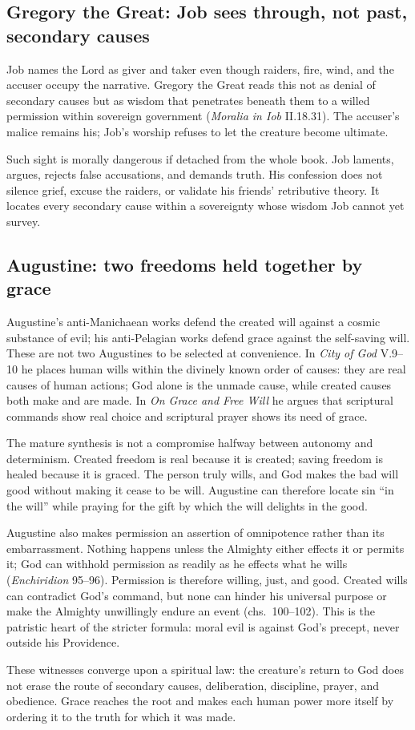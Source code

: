 \subsection{Gregory the Great: Job sees through, not past, secondary causes}

Job names the Lord as giver and taker even though raiders, fire, wind, and the accuser occupy the narrative. Gregory the Great reads this not as denial of secondary causes but as wisdom that penetrates beneath them to a willed permission within sovereign government (\emph{Moralia in Iob} II.18.31). The accuser's malice remains his; Job's worship refuses to let the creature become ultimate.

Such sight is morally dangerous if detached from the whole book. Job laments, argues, rejects false accusations, and demands truth. His confession does not silence grief, excuse the raiders, or validate his friends' retributive theory. It locates every secondary cause within a sovereignty whose wisdom Job cannot yet survey.

\subsection{Augustine: two freedoms held together by grace}

Augustine's anti-Manichaean works defend the created will against a cosmic substance of evil; his anti-Pelagian works defend grace against the self-saving will. These are not two Augustines to be selected at convenience. In \emph{City of God} V.9--10 he places human wills within the divinely known order of causes: they are real causes of human actions; God alone is the unmade cause, while created causes both make and are made. In \emph{On Grace and Free Will} he argues that scriptural commands show real choice and scriptural prayer shows its need of grace.

The mature synthesis is not a compromise halfway between autonomy and determinism. Created freedom is real because it is created; saving freedom is healed because it is graced. The person truly wills, and God makes the bad will good without making it cease to be will. Augustine can therefore locate sin ``in the will'' while praying for the gift by which the will delights in the good.

Augustine also makes permission an assertion of omnipotence rather than its embarrassment. Nothing happens unless the Almighty either effects it or permits it; God can withhold permission as readily as he effects what he wills (\emph{Enchiridion} 95--96). Permission is therefore willing, just, and good. Created wills can contradict God's command, but none can hinder his universal purpose or make the Almighty unwillingly endure an event (chs.~100--102). This is the patristic heart of the stricter formula: moral evil is against God's precept, never outside his Providence.

\enlargethispage{\baselineskip}
These witnesses converge upon a spiritual law: the creature's return to God does not erase the route of secondary causes, deliberation, discipline, prayer, and obedience. Grace reaches the root and makes each human power more itself by ordering it to the truth for which it was made.
